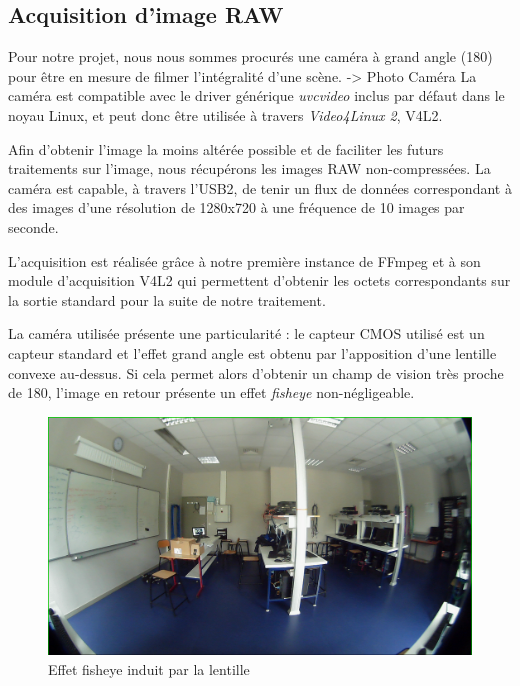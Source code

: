 \documentclass[11pt,a4paper]{article}
\begin{document}
\subsection{Acquisition d'image RAW}
Pour notre projet, nous nous sommes procurés une caméra à grand angle (180\degree) pour être en mesure de filmer l'intégralité d'une scène.
\bigbreak
-> Photo Caméra
\bigbreak
La caméra est compatible avec le driver générique \textit{uvcvideo} inclus par défaut dans le noyau Linux, et peut donc être utilisée à travers \textit{Video4Linux 2}, V4L2.

\bigbreak
Afin d'obtenir l'image la moins altérée possible et de faciliter les futurs traitements sur l'image, nous récupérons les images RAW non-compressées.
La caméra est capable, à travers l'USB2, de tenir un flux de données correspondant à des images d'une résolution de 1280x720 à une fréquence de 10 images par seconde.

\bigbreak
L'acquisition est réalisée grâce à notre première instance de FFmpeg et à son module d'acquisition V4L2 qui permettent d'obtenir les octets correspondants sur la sortie standard pour la suite de notre traitement.

\bigbreak
La caméra utilisée présente une particularité : le capteur CMOS utilisé est un capteur standard et l'effet grand angle est obtenu par l'apposition d'une lentille convexe au-dessus.
Si cela permet alors d'obtenir un champ de vision très proche de 180\degree, l'image en retour présente un effet \textit{fisheye} non-négligeable.

\bigbreak
\begin{figure}[H]
\begin{center}
\includegraphics[scale=0.2]{images/fisheye.png}
\end{center}
\caption{Effet fisheye induit par la lentille}
\label{}
\end{figure}
\bigbreak
\end{document}
